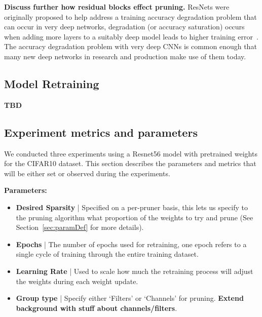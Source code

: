 \documentclass[../Dissertation.tex]{subfiles}
\begin{document}
\textbf{\color{red}Discuss further how residual blocks effect pruning.}
ResNets were originally proposed to help address a training accuracy degradation problem that can occur in very deep networks, degradation (or accuracy saturation) occurs when adding more layers to a suitably deep model leads to higher training error~\autocite{heDeepResidualLearning2016}.
The accuracy degradation problem with very deep CNNs is common enough that many new deep networks in research and production make use of them today.

\subsection{Model Retraining}
\textbf{TBD}



\subsection{Experiment metrics and parameters}\label{sec:metricsandparams}


We conducted three experiments using a Resnet56 model with pretrained weights for the CIFAR10 dataset.
This section describes the parameters and metrics that will be either set or observed during the experiments.

\singlespacing
\noindent\textbf{Parameters:}
\begin{itemize}
    \item \textbf{Desired Sparsity} | Specified on a per-pruner basis, this lets us specify to the pruning algorithm what proportion of the weights to try and prune (See Section~\ref{sec:paramDef} for more details).
    \item \textbf{Epochs} | The number of epochs used for retraining, one epoch refers to a single cycle of training through the entire training dataset.
    \item \textbf{Learning Rate} | Used to scale how much the retraining process will adjust the weights during each weight update.
    \item \textbf{Group type} | Specify either `Filters' or `Channels' for pruning. \textbf{\color{red}Extend background with stuff about channels/filters}.
\end{itemize}
\doublespacing
\end{document}
